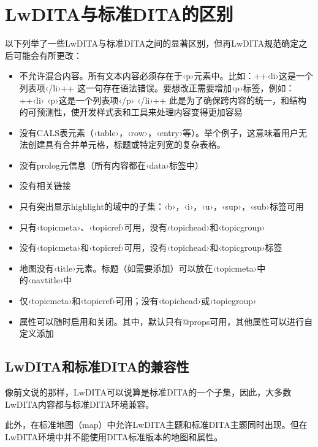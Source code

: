 \documentclass[letterpaper,10pt,english]{sphinxmanual}
\begin{document}
\section{LwDITA与标准DITA的区别}
\label{\detokenize{chap2:lwditadita}}
以下列举了一些LwDITA与标准DITA之间的显著区别，但再LwDITA规范确定之后可能会有所更改：
\begin{itemize}
\item {} 
不允许混合内容。所有文本内容必须存在于‹p›元素中。比如：++‹li›这是一个列表项‹/li›++ 这一句存在语法错误。要想改正需要增加‹p›标签，例如：++‹li› ‹p›这是一个列表项‹/p› ‹/li›++ 此是为了确保跨内容的统一，和结构的可预测性，使开发样式表和工具来处理内容变得更加容易

\item {} 
没有CALS表元素（‹table›，‹row›，‹entry›等）。举个例子，这意味着用户无法创建具有合并单元格，标题或特定列宽的复杂表格。

\item {} 
没有prolog元信息（所有内容都在‹data›标签中）

\item {} 
没有相关链接

\item {} 
只有突出显示highlight的域中的子集：‹b›，‹i›，‹u›，‹sup›，‹sub›标签可用

\item {} 
只有‹topicmeta›、‹topicref›可用，没有‹topichead›和‹topicgroup›

\item {} 
没有‹topicmeta›和‹topicref›可用，没有‹topichead›和‹topicgroup›标签

\item {} 
地图没有‹title›元素。标题（如需要添加）可以放在‹topicmeta›中的‹navtitle›中

\item {} 
仅‹topicmeta›和‹topicref›可用；没有‹topichead›或‹topicgroup›

\item {} 
属性可以随时启用和关闭。其中，默认只有@props可用，其他属性可以进行自定义添加

\end{itemize}


\subsection{LwDITA和标准DITA的兼容性}
\label{\detokenize{chap2:id5}}
像前文说的那样，LwDITA可以说算是标准DITA的一个子集，因此，大多数LwDITA内容都与标准DITA环境兼容。

此外，在标准地图（map）中允许LwDITA主题和标准DITA主题同时出现。但在LwDITA环境中并不能使用DITA标准版本的地图和属性。
\end{document}
